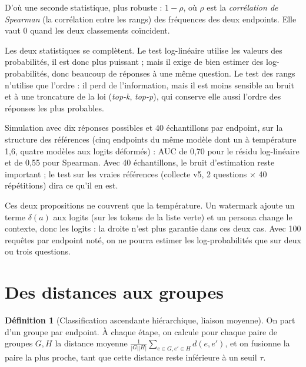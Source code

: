 \documentclass[11pt,a4paper]{report}
\theoremstyle{definition}
\newtheorem{definition}{Définition}[chapter]
\theoremstyle{plain}
\begin{document}
D'où une seconde statistique, plus robuste : $1-\rho$, où $\rho$ est la \emph{corrélation de Spearman} (la corrélation entre les rangs) des fréquences des deux endpoints. Elle vaut 0 quand les deux classements coïncident.

\begin{pourquoi}
Les deux statistiques se complètent. Le test log-linéaire utilise les valeurs des probabilités, il est donc plus puissant ; mais il exige de bien estimer des log-probabilités, donc beaucoup de réponses à une même question. Le test des rangs n'utilise que l'ordre : il perd de l'information, mais il est moins sensible au bruit et à une troncature de la loi (\emph{top-k}, \emph{top-p}), qui conserve elle aussi l'ordre des réponses les plus probables.
\end{pourquoi}

\begin{exemple}
Simulation avec dix réponses possibles et 40 échantillons par endpoint, sur la structure des références (cinq endpoints du même modèle dont un à température 1,6, quatre modèles aux logits déformés) : AUC de 0,70 pour le résidu log-linéaire et de 0,55 pour Spearman. Avec 40 échantillons, le bruit d'estimation reste important ; le test sur les vraies références (collecte v5, 2 questions $\times$ 40 répétitions) dira ce qu'il en est.
\end{exemple}

\begin{limite}
Ces deux propositions ne couvrent que la température. Un watermark ajoute un terme $\delta(a)$ aux logits (sur les tokens de la liste verte) et un persona change le contexte, donc les logits : la droite n'est plus garantie dans ces deux cas. Avec 100 requêtes par endpoint noté, on ne pourra estimer les log-probabilités que sur deux ou trois questions.
\end{limite}

\section{Des distances aux groupes}

\begin{definition}[Classification ascendante hiérarchique, liaison moyenne]
On part d'un groupe par endpoint. À chaque étape, on calcule pour chaque paire de groupes $G,H$ la distance moyenne $\frac1{|G||H|}\sum_{e\in G,e'\in H}d(e,e')$, et on fusionne la paire la plus proche, tant que cette distance reste inférieure à un seuil $\tau$.
\end{definition}
\end{document}
